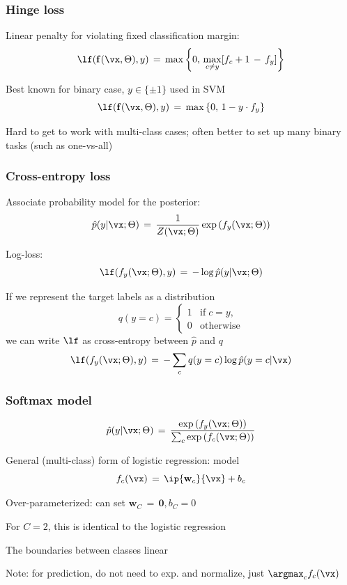 \documentclass[xcolor=dvipsnames]{beamer}
\begin{document}
\begin{frame}
  \frametitle{Hinge loss}
  \bi
\item Linear penalty for violating fixed classification margin:
\[\lf(\mathbf{f}(\vx,\Theta),y)\,=\,
\max\left\{
  0,\,
  \max_{c\ne y} [f_c+1\,-\,f_y]
\right\}
\]
\item Best known for binary case, $y\in\{\pm1\}$ used in SVM
\[\lf(\mathbf{f}(\vx,\Theta),y)\,=\,
\max\left\{
  0,\,1-y\cdot f_y
\right\}
\]
\item Hard to get to work with multi-class cases; often better to set
  up many binary tasks (such as one-vs-all)
\ei
\end{frame}

\begin{frame}
  \frametitle{Cross-entropy loss}
  \bi
\item Associate probability model for the posterior: 
\[\hat{p}(y|\vx;\Theta)\,=\,\frac{1}{Z(\vx;\Theta)}\exp\left(f_y(\vx;\Theta)\right)
\]
\item Log-loss:
\[\lf(f_y(\vx;\Theta),y)\,=\,-\log \hat{p}(y|\vx;\Theta)
\]
\item If we represent the target labels as a distribution
\[q(y=c)=\begin{cases}1 & \text{if}\;c=y,\\0 & \text{otherwise}
\end{cases}
\]
we can write $\lf$ as cross-entropy between $\hat{p}$ and $q$
\[\lf(f_y(\vx;\Theta),y)\,=\,-\sum_cq(y=c)\log \hat{p}(y=c|\vx)
\]
\ei
\end{frame}

\begin{frame}
  \frametitle{Softmax model}
\[
\hat{p}(y|\vx;\Theta)\,=\,\frac{\exp\left(f_y(\vx;\Theta)\right)}
{\sum_c \exp\left(f_c(\vx;\Theta)\right)}
\]
 \bi
 \item General (multi-class) form of logistic regression: model 
\[f_c(\vx)\,=\,\ip{\mathbf{w}_c}{\vx}+b_c
\]
\item Over-parameterized: can set $\mathbf{w}_C\,=\,\mathbf{0}, b_C=0$
 \item For $C=2$, this is identical to the logistic regression
 \item The boundaries between classes linear
 \item Note: for prediction, do not need to exp. and normalize, just
$\argmax_cf_c(\vx)$
 \ei
\end{frame}
\end{document}
